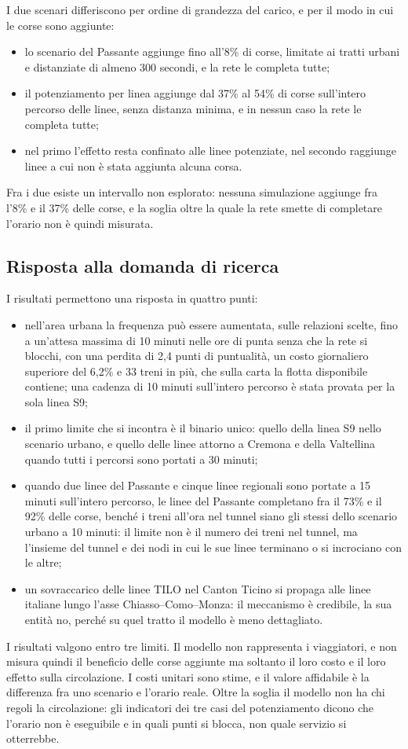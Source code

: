 I due scenari differiscono per ordine di grandezza del carico, e per il modo in cui le corse sono aggiunte:
\begin{itemize}
	\item lo scenario del Passante aggiunge fino all'8\% di corse, limitate ai tratti urbani e distanziate di almeno 300 secondi, e la rete le completa tutte;
	\item il potenziamento per linea aggiunge dal 37\% al 54\% di corse sull'intero percorso delle linee, senza distanza minima, e in nessun caso la rete le completa tutte;
	\item nel primo l'effetto resta confinato alle linee potenziate, nel secondo raggiunge linee a cui non è stata aggiunta alcuna corsa.
\end{itemize}
Fra i due esiste un intervallo non esplorato: nessuna simulazione aggiunge fra l'8\% e il 37\% delle corse, e la soglia oltre la quale la rete smette di completare l'orario non è quindi misurata.

\subsection{Risposta alla domanda di ricerca}
I risultati permettono una risposta in quattro punti:
\begin{itemize}
	\item nell'area urbana la frequenza può essere aumentata, sulle relazioni scelte, fino a un'attesa massima di 10 minuti nelle ore di punta senza che la rete si blocchi, con una perdita di 2,4 punti di puntualità, un costo giornaliero superiore del 6,2\% e 33 treni in più, che sulla carta la flotta disponibile contiene; una cadenza di 10 minuti sull'intero percorso è stata provata per la sola linea S9;
	\item il primo limite che si incontra è il binario unico: quello della linea S9 nello scenario urbano, e quello delle linee attorno a Cremona e della Valtellina quando tutti i percorsi sono portati a 30 minuti;
	\item quando due linee del Passante e cinque linee regionali sono portate a 15 minuti sull'intero percorso, le linee del Passante completano fra il 73\% e il 92\% delle corse, benché i treni all'ora nel tunnel siano gli stessi dello scenario urbano a 10 minuti: il limite non è il numero dei treni nel tunnel, ma l'insieme del tunnel e dei nodi in cui le sue linee terminano o si incrociano con le altre;
	\item un sovraccarico delle linee TILO nel Canton Ticino si propaga alle linee italiane lungo l'asse Chiasso--Como--Monza: il meccanismo è credibile, la sua entità no, perché su quel tratto il modello è meno dettagliato.
\end{itemize}

I risultati valgono entro tre limiti. Il modello non rappresenta i viaggiatori, e non misura quindi il beneficio delle corse aggiunte ma soltanto il loro costo e il loro effetto sulla circolazione. I costi unitari sono stime, e il valore affidabile è la differenza fra uno scenario e l'orario reale. Oltre la soglia il modello non ha chi regoli la circolazione: gli indicatori dei tre casi del potenziamento dicono che l'orario non è eseguibile e in quali punti si blocca, non quale servizio si otterrebbe.
